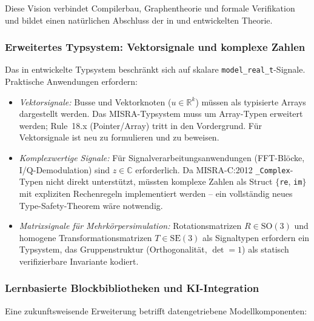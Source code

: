 ﻿\documentclass[12pt,a4paper]{article}
\theoremstyle{definition}
\begin{document}
Diese Vision verbindet Compilerbau, Graphentheorie und formale
Verifikation und bildet einen natürlichen Abschluss der in
 und  entwickelten Theorie.

\subsubsection{Erweitertes Typsystem: Vektorsignale und komplexe Zahlen}

Das in  entwickelte Typsystem beschränkt sich auf skalare
\texttt{model\_real\_t}-Signale. Praktische Anwendungen erfordern:

\begin{itemize}
  \item \emph{Vektorsignale:} Busse und Vektorknoten ($u \in \mathbb{R}^k$)
        müssen als typisierte Arrays dargestellt werden. Das MISRA-Typsystem
        muss um Array-Typen erweitert werden; Rule~18.x (Pointer/Array)
        tritt in den Vordergrund. Für Vektorsignale ist 
        neu zu formulieren und zu beweisen.

  \item \emph{Komplexwertige Signale:} Für Signalverarbeitungsanwendungen
        (FFT-Blöcke, I/Q-Demodulation) sind $z \in \mathbb{C}$ erforderlich.
        Da MISRA-C:2012 \texttt{\_Complex}-Typen nicht direkt unterstützt,
        müssten komplexe Zahlen als Struct $\{$\texttt{re}, \texttt{im}$\}$
        mit expliziten Rechenregeln implementiert werden -- ein vollständig
        neues Type-Safety-Theorem wäre notwendig.

  \item \emph{Matrixsignale für Mehrkörpersimulation:} Rotationsmatrizen
        $R \in \mathrm{SO}(3)$ und homogene Transformationsmatrizen
        $T \in \mathrm{SE}(3)$ als Signaltypen erfordern ein Typsystem,
        das Gruppenstruktur (Orthogonalität, $\det = 1$) als statisch
        verifizierbare Invariante kodiert.
\end{itemize}

\subsubsection{Lernbasierte Blockbibliotheken und KI-Integration}

Eine zukunftsweisende Erweiterung betrifft datengetriebene Modellkomponenten:
\end{document}
